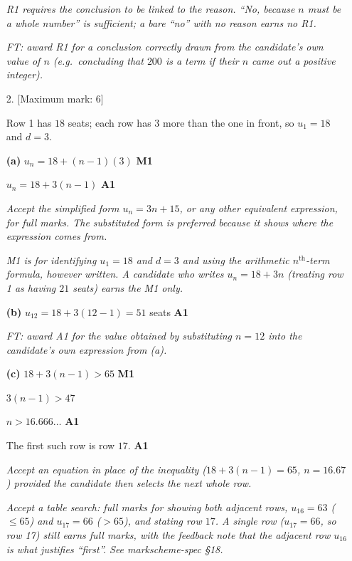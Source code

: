 \documentclass[12pt, twoside]{article}
\begin{document}
\begin{enumerate}[itemsep=0.3cm]
\emph{R1 requires the conclusion to be linked to the reason. ``No,
because $n$ must be a whole number'' is sufficient; a bare ``no'' with
no reason earns no R1.}

\emph{FT: award R1 for a conclusion correctly drawn from the
candidate's own value of $n$ (e.g.\ concluding that $200$ \emph{is} a
term if their $n$ came out a positive integer).}

\newpage

\item[2.] [Maximum mark: 6]

Row 1 has $18$ seats; each row has $3$ more than the one in front,
so $u_{1} = 18$ and $d = 3$.

\medskip

\textbf{(a)} $u_{n} = 18 + (n - 1)(3)$ \hfill \textbf{M1}

$u_{n} = 18 + 3(n - 1)$ \hfill \textbf{A1}

\emph{Accept the simplified form $u_{n} = 3n + 15$, or any other equivalent
expression, for full marks. The substituted form is preferred because it
shows where the expression comes from.}

\emph{M1 is for identifying $u_{1} = 18$ and $d = 3$ and using the
arithmetic $n^{\text{th}}$-term formula, however written. A candidate who
writes $u_{n} = 18 + 3n$ (treating row 1 as having $21$ seats) earns the
M1 only.}

\medskip

\textbf{(b)} $u_{12} = 18 + 3(12 - 1) = 51$ seats \hfill \textbf{A1}

\emph{FT: award A1 for the value obtained by substituting $n = 12$
into the candidate's own expression from (a).}

\medskip

\textbf{(c)} $18 + 3(n - 1) > 65$ \hfill \textbf{M1}

$3(n - 1) > 47$

$n > 16.666\ldots$ \hfill \textbf{A1}

The first such row is row $17$. \hfill \textbf{A1}

\emph{Accept an equation in place of the inequality
($18 + 3(n - 1) = 65$, $n = 16.67$) provided the candidate then selects
the next whole row.}

\emph{Accept a table search: full marks for showing both adjacent
rows, $u_{16} = 63$ ($\le 65$) and $u_{17} = 66$ ($> 65$), and stating
row $17$. A single row ($u_{17} = 66$, so row 17) still earns full
marks, with the feedback note that the adjacent row $u_{16}$ is what
justifies ``first''. See markscheme-spec §18.}


\end{enumerate}
\end{document}
